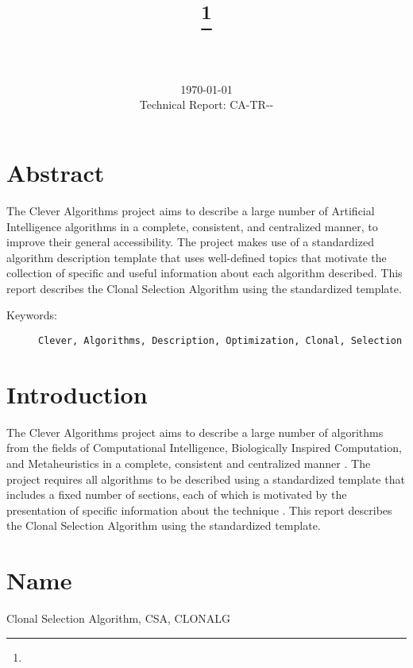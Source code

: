 \documentclass[a4paper, 11pt]{article}
\title{{\myreporttitle}\footnote{\myreportlicense}}
\author{\myreportauthor\\{\myreportemail}\\\small\myreportproject}
\date{\today\\{\small{Technical Report: CA-TR-{\myreportdate}-\myreportversion}}}
\begin{document}
\maketitle

\section*{Abstract} 
The Clever Algorithms project aims to describe a large number of Artificial Intelligence algorithms in a complete, consistent, and centralized manner, to improve their general accessibility. 
The project makes use of a standardized algorithm description template that uses well-defined topics that motivate the collection of specific and useful information about each algorithm described.
This report describes the Clonal Selection Algorithm using the standardized template.

\begin{description}
	\item[Keywords:] {\small\texttt{Clever, Algorithms, Description, Optimization, Clonal, Selection}}
\end{description} 

\section{Introduction} 
\label{sec:intro}
The Clever Algorithms project aims to describe a large number of algorithms from the fields of Computational Intelligence, Biologically Inspired Computation, and Metaheuristics in a complete, consistent and centralized manner \cite{Brownlee2010}.
The project requires all algorithms to be described using a standardized template that includes a fixed number of sections, each of which is motivated by the presentation of specific information about the technique \cite{Brownlee2010a}.
This report describes the Clonal Selection Algorithm using the standardized template.

\section{Name} 
\label{sec:name}
Clonal Selection Algorithm, CSA, CLONALG
\end{document}
